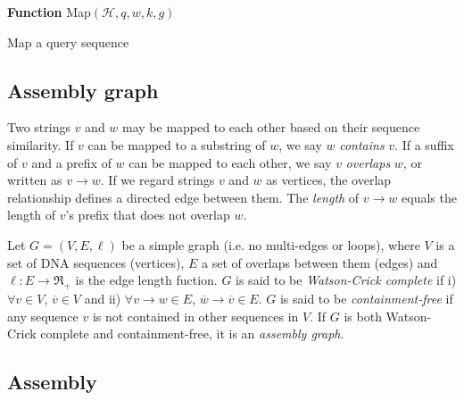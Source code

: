 \documentclass{bioinfo}
\begin{document}
\begin{methods}
\begin{algorithm}[ht]
\DontPrintSemicolon
\footnotesize
{}
\BlankLine
\textbf{Function} {\sc Map}$(\mathcal{H},q,w,k,g)$
\caption{Map a query sequence}
\end{algorithm}

\subsection{Assembly graph}

Two strings $v$ and $w$ may be mapped to each other based on their sequence
similarity. If $v$ can be mapped to a substring of $w$, we say $w$
\emph{contains} $v$. If a suffix of $v$ and a prefix of $w$ can be mapped to
each other, we say $v$ \emph{overlaps} $w$, or written as $v\to w$.
If we regard strings $v$ and $w$ as vertices, the overlap relationship defines
a directed edge between them. The \emph{length} of $v\to w$ equals the length
of $v$'s prefix that does not overlap $w$.

Let $G=(V,E,\ell)$ be a simple graph (i.e. no multi-edges or loops), where $V$ is a
set of DNA sequences (vertices), $E$ a set of overlaps between them (edges) and
$\ell:E\to\Re_+$ is the edge length fuction. $G$ is said to be
\emph{Watson-Crick complete} if i) $\forall v\in V$, $\overline{v}\in V$ and
ii) $\forall v\to w\in E$, $\overline{w}\to\overline{v}\in E$. $G$ is said to
be \emph{containment-free} if any sequence $v$ is not contained in other
sequences in $V$. If $G$ is both Watson-Crick complete and containment-free, it
is an \emph{assembly graph}.

\subsection{Assembly}

\end{methods}


\end{document}
